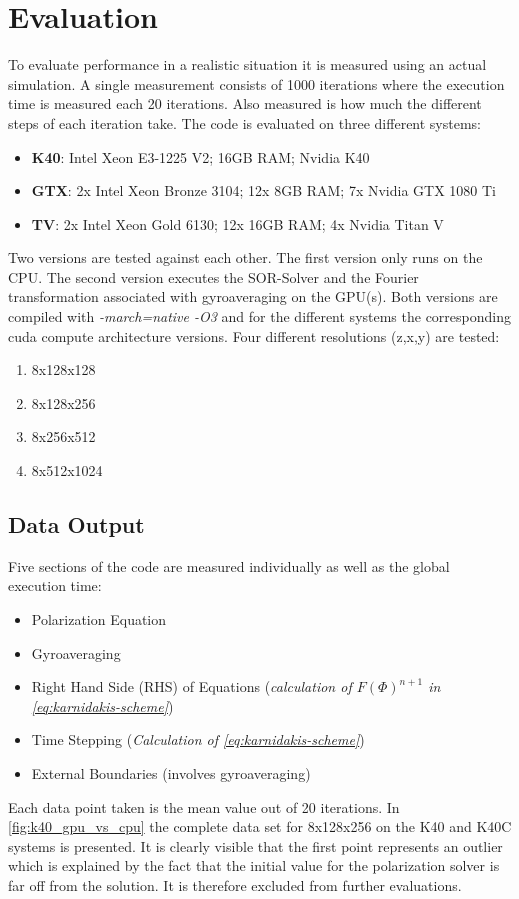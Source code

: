 \documentclass[master.tex]{subfiles}
\begin{document}
\section{Evaluation}
To evaluate performance in a realistic situation it is measured using an actual simulation. A single measurement consists of 1000 iterations where the execution time is measured each 20 iterations. Also measured is how much the different steps of each iteration take.\newline
The code is evaluated on three different systems:
\begin{itemize}
    \item \textbf{\ac{K40}}: Intel Xeon E3-1225 V2; 16GB RAM; Nvidia K40
    \item \textbf{\ac{GTX}}: 2x Intel Xeon Bronze 3104; 12x 8GB RAM; 7x Nvidia GTX 1080 Ti
    \item \textbf{\ac{TV}}: 2x Intel Xeon Gold 6130; 12x 16GB RAM; 4x Nvidia Titan V
\end{itemize}
Two versions are tested against each other. The first version only runs on the CPU. The second version executes the \ac{SOR}-Solver and the Fourier transformation associated with gyroaveraging on the GPU(s). Both versions are compiled with \textit{-march=native -O3} and for the different systems the corresponding cuda compute architecture versions. Four different resolutions (z,x,y) are tested:
\begin{enumerate}
    \item 8x128x128
    \item 8x128x256
    \item 8x256x512
    \item 8x512x1024
\end{enumerate}

\subsection{Data Output}
Five sections of the code are measured individually as well as the global execution time:
\begin{itemize}
    \item Polarization Equation
    \item Gyroaveraging
    \item Right Hand Side (RHS) of Equations (\textit{calculation of $F(\Phi)^{n+1}$ in \autoref{eq:karnidakis-scheme}})
    \item Time Stepping (\textit{Calculation of \autoref{eq:karnidakis-scheme}})
    \item External Boundaries (involves gyroaveraging)
\end{itemize}
Each data point taken is the mean value out of 20 iterations. In \autoref{fig:k40_gpu_vs_cpu} the complete data set for 8x128x256 on the \ac{K40} and \ac{K40C} systems is presented. It is clearly visible that the first point represents an outlier which is explained by the fact that the initial value for the polarization solver is far off from the solution. It is therefore excluded from further evaluations. 
\end{document}
